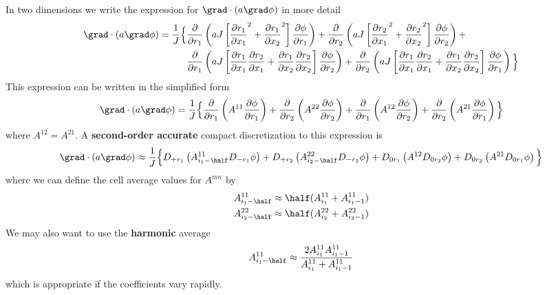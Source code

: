 In two dimensions we write the expression for $\grad\cdot( a \grad \phi)$ in more detail
\begin{align*}
\grad\cdot( a \grad \phi) = {1\over J} \Big\lbrace  
      & {\partial\over\partial r_1}\left( 
         a J\left[ {\partial r_1 \over \partial x_1 }^2 + {\partial r_1 \over \partial x_2 }^2 \right]
                    {\partial \phi \over\partial r_1} \right) +
        {\partial\over\partial r_2}\left( 
         a J\left[ {\partial r_2 \over \partial x_1 }^2 + {\partial r_2 \over \partial x_2 }^2 \right]
                    {\partial \phi \over\partial r_2} \right) + \\
      & {\partial\over\partial r_1}\left( 
         a J\left[ {\partial r_1\over\partial x_1}{\partial r_2\over\partial x_1} 
                 + {\partial r_1\over\partial x_2}{\partial r_2\over\partial x_2 } \right]
                    {\partial \phi \over\partial r_2} \right) + 
        {\partial\over\partial r_2}\left( 
         a J\left[ {\partial r_1\over\partial x_1}{\partial r_2\over\partial x_1} 
                 + {\partial r_1\over\partial x_2}{\partial r_2\over\partial x_2 } \right]
                    {\partial \phi \over\partial r_1} \right) \Big\rbrace \\
\end{align*}
This expression can be written in the simplified form
\[
\grad\cdot( a \grad \phi) = {1\over J} \Big\lbrace  
        {\partial\over\partial r_1}\left( A^{11} {\partial \phi \over\partial r_1} \right) +
        {\partial\over\partial r_2}\left( A^{22} {\partial \phi \over\partial r_2} \right) + 
        {\partial\over\partial r_1}\left( A^{12} {\partial \phi \over\partial r_2} \right) + 
        {\partial\over\partial r_2}\left( A^{21} {\partial \phi \over\partial r_1} \right) \Big\rbrace 
\]
where $A^{12}=A^{21}$.
A {\bf second-order accurate} compact discretization to this expression is
\[
  \grad\cdot( a \grad \phi) \approx {1\over J} \Big\lbrace
        D_{+ r_1}\left( A^{11}_{i_1-\half}D_{- r_1}\phi \right) +
        D_{+ r_2}\left( A^{22}_{i_2-\half}D_{- r_2}\phi \right) + 
        D_{0 r_1}\left( A^{12}            D_{0 r_2}\phi \right) + 
        D_{0 r_2}\left( A^{21}            D_{0 r_1}\phi \right) \Big\rbrace 
\]
where we can define the cell average values for $A^{mn}$ by
\begin{align*}
   A^{11}_{i_1-\half} &\approx \half( A^{11}_{i_1}+A^{11}_{i_1-1} ) \\
   A^{22}_{i_2-\half} &\approx \half( A^{22}_{i_2}+A^{22}_{i_2-1} )
\end{align*}
We may also want to use the {\bf harmonic} average
\[
   A^{11}_{i_1-\half} \approx { 2 A^{11}_{i_1} A^{11}_{i_1-1} \over A^{11}_{i_1}+A^{11}_{i_1-1} } 
\]
which is appropriate if the coefficients vary rapidly.


